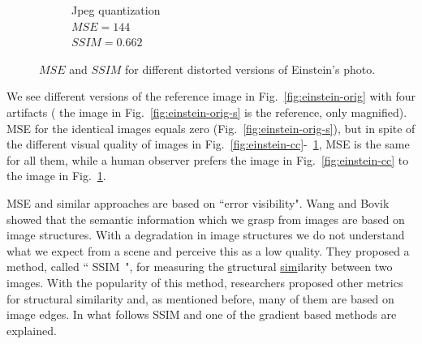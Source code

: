 \begin{figure}
\begin{subfigure}[b]{0.3\textwidth}
         \caption{Jpeg quantization\\$MSE=144$\\$SSIM = 0.662$}
         \label{fig:einstein-jp}
     \end{subfigure}
        \caption{$MSE$ and $SSIM$ for different distorted versions of Einstein's photo.}
        \label{fig:einstein}
\end{figure}
We see different versions of the reference image in Fig.~\ref{fig:einstein-orig} with four artifacts ( the image in Fig.~\ref{fig:einstein-orig-s} is the reference, only magnified). MSE for the identical images equals zero (Fig.~\ref{fig:einstein-orig-s}), but in spite of the different visual quality of images in Fig.~\ref{fig:einstein-cc}-~\ref{fig:einstein-jp}, MSE is the same for all them, while a human observer prefers the image in Fig.~\ref{fig:einstein-cc} to the image in Fig.~\ref{fig:einstein-jp}.

MSE and similar approaches are based on ``error visibility". Wang and Bovik~\cite{Wang2002a} showed that the semantic information which we grasp from images are based on image structures. With a degradation in image structures we do not understand what we expect from a scene and perceive this as a low quality. They proposed a method, called `` SSIM~\cite{Wang2004}", for measuring the \underline{s}tructural \underline{sim}ilarity between two images. With the popularity of this method, researchers proposed other metrics for structural similarity and, as mentioned before, many of them are based on image edges. In what follows SSIM and one of the gradient based methods are explained.
